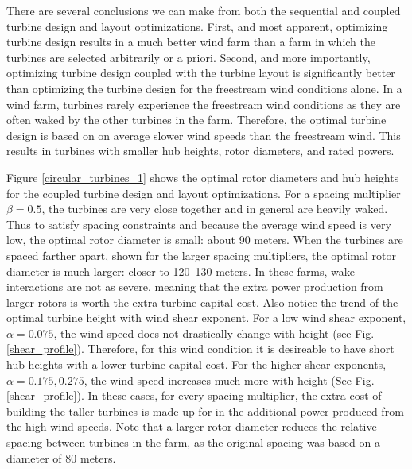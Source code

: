 There are several conclusions we can make from both the sequential and coupled turbine design and layout optimizations. First, and most apparent, optimizing turbine design results in a much better wind farm than a farm in which the turbines are selected arbitrarily or a priori. Second, and more importantly, optimizing turbine design coupled with the turbine layout is significantly better than optimizing the turbine design for the freestream wind conditions alone. In a wind farm, turbines rarely experience the freestream wind conditions as they are often waked by the other turbines in the farm. Therefore, the optimal turbine design is based on on average slower wind speeds than the freestream wind. This results in turbines with smaller hub heights, rotor diameters, and rated powers. 

Figure \ref{circular_turbines_1} shows the optimal rotor diameters and hub heights for the coupled turbine design and layout optimizations. For a spacing multiplier $\beta=0.5$, the turbines are very close together and in general are heavily waked. Thus to satisfy spacing constraints and because the average wind speed is very low, the optimal rotor diameter is small: about 90 meters. When the turbines are spaced farther apart, shown for the larger spacing multipliers, the optimal rotor diameter is much larger: closer to 120--130 meters. In these farms, wake interactions are not as severe, meaning that the extra power production from larger rotors is worth the extra turbine capital cost. Also notice the trend of the optimal turbine height with wind shear exponent. For a low wind shear exponent, $\alpha=0.075$, the wind speed does not drastically change with height (see Fig. \ref{shear_profile}). Therefore, for this wind condition it is desireable to have short hub heights with a lower turbine capital cost. For the higher shear exponents, $\alpha=0.175,0.275$, the wind speed increases much more with height (See Fig. \ref{shear_profile}). In these cases, for every spacing multiplier, the extra cost of building the taller turbines is made up for in the additional power produced from the high wind speeds. Note that a larger rotor diameter reduces the relative spacing between turbines in the farm, as the original spacing was based on a diameter of 80 meters.

